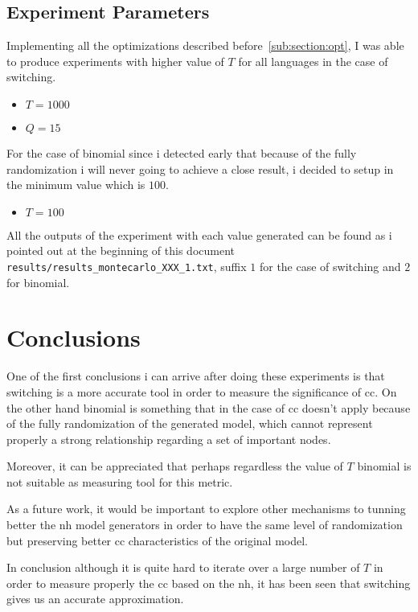\documentclass[12pt, a4paper]{article}
\begin{document}
\subsection{Experiment Parameters}
Implementing all the optimizations described before~\ref{sub:section:opt}, I was able to produce experiments with higher value of $T$
for all languages in the case of \acrshort{switching}.

\begin{itemize}
    \item $T = 1000$ 
    \item $Q = 15$
\end{itemize}

For the case of \acrshort{binomial} since i detected early that because of the fully randomization i will never going to achieve a close result, i decided
to setup in the minimum value which is $100$.
\begin{itemize}
    \item $T = 100$ 
\end{itemize}

All the outputs of the experiment with each value generated can be found as i pointed out at the beginning of this document 
\texttt{results/results_montecarlo_XXX_1.txt}, suffix $1$ for the case of \acrshort{switching} and $2$ for \acrshort{binomial}.

\section{Conclusions}
One of the first conclusions i can arrive after doing these experiments is that \acrshort{switching} is a more accurate
tool in order to measure the significance of \acrshort{cc}. On the other hand \acrshort{binomial} is something that in the case
of \acrshort{cc} doesn't apply because of the fully randomization of the generated model, which cannot represent properly a strong
relationship regarding a set of important nodes. 

Moreover, it can be appreciated that perhaps regardless the value of $T$ \acrshort{binomial} is not suitable as measuring tool for this
metric.

As a future work, it would be important to explore other mechanisms to tunning better the \acrshort{nh} model generators in order
to have the same level of randomization but preserving better \acrshort{cc} characteristics of the original model.

In conclusion although it is quite hard to iterate over a large number of $T$ in order to measure properly the \acrshort{cc} based on the \acrshort{nh},
it has been seen that \acrshort{switching} gives us an accurate approximation.
\end{document}
